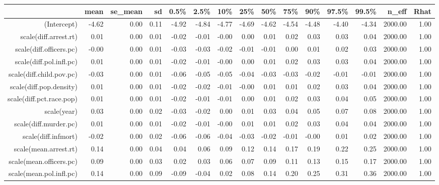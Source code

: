 \begin{table}[ht]
\centering
\begin{tabular}{rrrrrrrrrrrrrrr}
  \hline
 & mean & se\_mean & sd & 0.5\% & 2.5\% & 10\% & 25\% & 50\% & 75\% & 90\% & 97.5\% & 99.5\% & n\_eff & Rhat \\ 
  \hline
(Intercept) & -4.62 & 0.00 & 0.11 & -4.92 & -4.84 & -4.77 & -4.69 & -4.62 & -4.54 & -4.48 & -4.40 & -4.34 & 2000.00 & 1.00 \\ 
  scale(diff.arrest.rt) & 0.01 & 0.00 & 0.01 & -0.02 & -0.01 & -0.00 & 0.00 & 0.01 & 0.02 & 0.03 & 0.03 & 0.04 & 2000.00 & 1.00 \\ 
  scale(diff.officers.pc) & -0.00 & 0.00 & 0.01 & -0.03 & -0.03 & -0.02 & -0.01 & -0.01 & 0.00 & 0.01 & 0.02 & 0.03 & 2000.00 & 1.00 \\ 
  scale(diff.pol.infl.pc) & 0.01 & 0.00 & 0.01 & -0.02 & -0.01 & -0.00 & 0.00 & 0.01 & 0.02 & 0.03 & 0.03 & 0.04 & 2000.00 & 1.00 \\ 
  scale(diff.child.pov.pc) & -0.03 & 0.00 & 0.01 & -0.06 & -0.05 & -0.05 & -0.04 & -0.03 & -0.03 & -0.02 & -0.01 & -0.01 & 2000.00 & 1.00 \\ 
  scale(diff.pop.density) & 0.01 & 0.00 & 0.01 & -0.02 & -0.02 & -0.01 & -0.00 & 0.01 & 0.01 & 0.02 & 0.03 & 0.04 & 2000.00 & 1.00 \\ 
  scale(diff.pct.race.pop) & 0.01 & 0.00 & 0.01 & -0.02 & -0.01 & -0.01 & 0.00 & 0.01 & 0.02 & 0.03 & 0.04 & 0.05 & 2000.00 & 1.00 \\ 
  scale(year) & 0.03 & 0.00 & 0.02 & -0.03 & -0.02 & 0.00 & 0.01 & 0.03 & 0.04 & 0.05 & 0.07 & 0.08 & 2000.00 & 1.00 \\ 
  scale(diff.murder.pc) & 0.01 & 0.00 & 0.01 & -0.02 & -0.01 & -0.00 & 0.01 & 0.01 & 0.02 & 0.03 & 0.04 & 0.04 & 2000.00 & 1.00 \\ 
  scale(diff.infmort) & -0.02 & 0.00 & 0.02 & -0.06 & -0.06 & -0.04 & -0.03 & -0.02 & -0.01 & -0.00 & 0.01 & 0.02 & 2000.00 & 1.00 \\ 
  scale(mean.arrest.rt) & 0.14 & 0.00 & 0.04 & 0.04 & 0.06 & 0.09 & 0.12 & 0.14 & 0.17 & 0.19 & 0.22 & 0.25 & 2000.00 & 1.00 \\ 
  scale(mean.officers.pc) & 0.09 & 0.00 & 0.03 & 0.02 & 0.03 & 0.06 & 0.07 & 0.09 & 0.11 & 0.13 & 0.15 & 0.17 & 2000.00 & 1.00 \\ 
  scale(mean.pol.infl.pc) & 0.14 & 0.00 & 0.09 & -0.09 & -0.04 & 0.02 & 0.08 & 0.14 & 0.20 & 0.25 & 0.31 & 0.36 & 2000.00 & 1.00 \\ 

\end{tabular}
\end{table}
